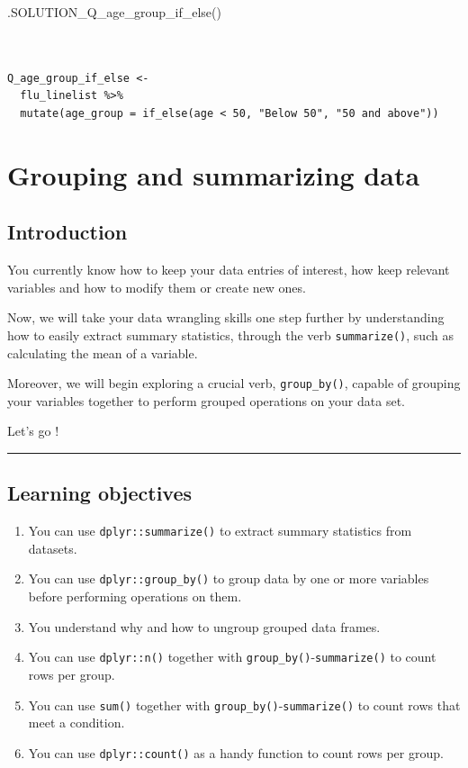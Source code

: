 \documentclass[
  letterpaper,
  DIV=11,
  numbers=noendperiod]{scrreprt}
\newenvironment{Shaded}{\begin{snugshade}}{\end{snugshade}}
\newcommand{\FunctionTok}[1]{\textcolor[rgb]{0.28,0.35,0.67}{#1}}
\newcommand{\NormalTok}[1]{\textcolor[rgb]{0.00,0.23,0.31}{#1}}
\begin{document}
\begin{Shaded}
\begin{Highlighting}[]
\FunctionTok{.SOLUTION\_Q\_age\_group\_if\_else}\NormalTok{()}
\end{Highlighting}
\end{Shaded}

\begin{verbatim}


Q_age_group_if_else <- 
  flu_linelist %>% 
  mutate(age_group = if_else(age < 50, "Below 50", "50 and above"))
\end{verbatim}

\chapter{Grouping and summarizing
data}\label{grouping-and-summarizing-data}

\section{Introduction}\label{introduction-10}

You currently know how to keep your data entries of interest, how keep
relevant variables and how to modify them or create new ones.

Now, we will take your data wrangling skills one step further by
understanding how to easily extract summary statistics, through the verb
\texttt{summarize()}, such as calculating the mean of a variable.

Moreover, we will begin exploring a crucial verb, \texttt{group\_by()},
capable of grouping your variables together to perform grouped
operations on your data set.

Let's go !

\begin{center}\rule{0.5\linewidth}{0.5pt}\end{center}

\section{Learning objectives}\label{learning-objectives-10}

\begin{enumerate}
\def\labelenumi{\arabic{enumi}.}
\item
  You can use \texttt{dplyr::summarize()} to extract summary statistics
  from datasets.
\item
  You can use \texttt{dplyr::group\_by()} to group data by one or more
  variables before performing operations on them.
\item
  You understand why and how to ungroup grouped data frames.
\item
  You can use \texttt{dplyr::n()} together with
  \texttt{group\_by()}-\texttt{summarize()} to count rows per group.
\item
  You can use \texttt{sum()} together with
  \texttt{group\_by()}-\texttt{summarize()} to count rows that meet a
  condition.
\item
  You can use \texttt{dplyr::count()} as a handy function to count rows
  per group.
\end{enumerate}
\end{document}
